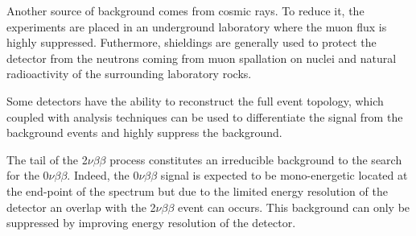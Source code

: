 \documentclass[main.tex]{subfiles}
\begin{document}
\bigskip  





\NI Another source of background comes from cosmic rays. To reduce it, the experiments are placed in an underground laboratory where the muon flux is highly suppressed. Futhermore, shieldings are generally used to protect the detector from the neutrons coming from muon spallation on nuclei and natural radioactivity of the surrounding laboratory rocks.


\bigskip


\NI Some detectors have the ability to reconstruct the full event topology,  which coupled with analysis techniques can be used to differentiate the signal from the background events and highly suppress the background.


\bigskip


\NI The tail of the 2$\nu\beta\beta$ process constitutes an irreducible background to the search for the 0$\nu\beta\beta$. Indeed, the 0$\nu\beta\beta$ signal is expected to be mono-energetic located at the end-point of the spectrum but due to the limited energy resolution of the detector an overlap with the 2$\nu\beta\beta$ event can occurs. This background can only be suppressed by improving energy resolution of the detector.  
\end{document}
